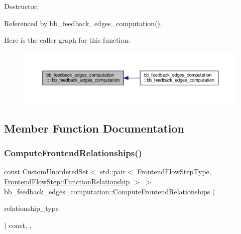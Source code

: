 Destructor. 



Referenced by bb\+\_\+feedback\+\_\+edges\+\_\+computation().

Here is the caller graph for this function\+:
\nopagebreak
\begin{figure}[H]
\begin{center}
\leavevmode
\includegraphics[width=350pt]{db/dd2/classbb__feedback__edges__computation_a10e831308d94bd853e9ee715bd728dca_icgraph}
\end{center}
\end{figure}


\subsection{Member Function Documentation}
\mbox{\label{classbb__feedback__edges__computation_a9ea7749360a9e109bc92714c4861d135}} 
\subsubsection{\texorpdfstring{Compute\+Frontend\+Relationships()}{ComputeFrontendRelationships()}}
{\footnotesize\ttfamily const \hyperlink{classCustomUnorderedSet}{Custom\+Unordered\+Set}$<$ std\+::pair$<$ \hyperlink{frontend__flow__step_8hpp_afeb3716c693d2b2e4ed3e6d04c3b63bb}{Frontend\+Flow\+Step\+Type}, \hyperlink{classFrontendFlowStep_af7cf30f2023e5b99e637dc2058289ab0}{Frontend\+Flow\+Step\+::\+Function\+Relationship} $>$ $>$ bb\+\_\+feedback\+\_\+edges\+\_\+computation\+::\+Compute\+Frontend\+Relationships (\begin{DoxyParamCaption}\item[{const \hyperlink{classDesignFlowStep_a723a3baf19ff2ceb77bc13e099d0b1b7}{Design\+Flow\+Step\+::\+Relationship\+Type}}]{relationship\+\_\+type }\end{DoxyParamCaption}) const\hspace{0.3cm}{\ttfamily [override]}, {\ttfamily [private]}, {\ttfamily [virtual]}}



